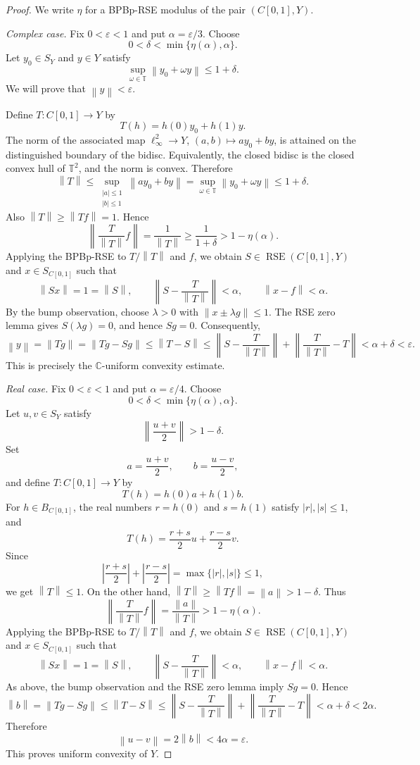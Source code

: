 \documentclass[11pt]{article}
\newcommand{\C}{\mathbb C}
\newcommand{\T}{\mathbb T}
\newcommand{\RSE}{\operatorname{RSE}}
\newcommand{\norm}[1]{\left\lVert #1 \right\rVert}
\begin{document}
\begin{proof}
We write $\eta$ for a BPBp-RSE modulus of the pair $(C[0,1],Y)$.

\smallskip
\noindent\emph{Complex case.}
Fix $0<\varepsilon<1$ and put $\alpha=\varepsilon/3$. Choose
\[
  0<\delta<\min\{\eta(\alpha),\alpha\}.
\]
Let $y_0\in S_Y$ and $y\in Y$ satisfy
\[
  \sup_{\omega\in\T}\norm{y_0+\omega y}\le 1+\delta.
\]
We will prove that $\norm{y}<\varepsilon$.

Define $T\colon C[0,1]\to Y$ by
\[
  T(h)=h(0)y_0+h(1)y.
\]
The norm of the associated map $\ell_\infty^2\to Y$,
$(a,b)\mapsto ay_0+by$, is attained on the distinguished boundary of the
bidisc. Equivalently, the closed bidisc is the closed convex hull of
$\T^2$, and the norm is convex. Therefore
\[
  \norm{T}
  \le
  \sup_{\substack{|a|\le 1\\ |b|\le 1}}\norm{ay_0+by}
  =
  \sup_{\omega\in\T}\norm{y_0+\omega y}
  \le 1+\delta.
\]
Also $\norm{T}\ge\norm{Tf}=1$. Hence
\[
  \left\|\frac{T}{\norm{T}}f\right\|
  =\frac{1}{\norm{T}}
  \ge \frac{1}{1+\delta}
  >1-\eta(\alpha).
\]
Applying the BPBp-RSE to $T/\norm{T}$ and $f$, we obtain
$S\in\RSE(C[0,1],Y)$ and $x\in S_{C[0,1]}$ such that
\[
  \norm{Sx}=1=\norm{S},\qquad
  \left\|S-\frac{T}{\norm{T}}\right\|<\alpha,\qquad
  \norm{x-f}<\alpha.
\]
By the bump observation, choose $\lambda>0$ with
$\norm{x\pm\lambda g}\le 1$. The RSE zero lemma gives
$S(\lambda g)=0$, and hence $Sg=0$. Consequently,
\[
  \norm{y}
  =
  \norm{Tg}
  =
  \norm{Tg-Sg}
  \le
  \norm{T-S}
  \le
  \left\|S-\frac{T}{\norm{T}}\right\|
     +\left\|\frac{T}{\norm{T}}-T\right\|
  <
  \alpha+\delta
  <\varepsilon.
\]
This is precisely the $\C$-uniform convexity estimate.

\smallskip
\noindent\emph{Real case.}
Fix $0<\varepsilon<1$ and put $\alpha=\varepsilon/4$. Choose
\[
  0<\delta<\min\{\eta(\alpha),\alpha\}.
\]
Let $u,v\in S_Y$ satisfy
\[
  \left\|\frac{u+v}{2}\right\|>1-\delta.
\]
Set
\[
  a=\frac{u+v}{2},\qquad b=\frac{u-v}{2},
\]
and define $T\colon C[0,1]\to Y$ by
\[
  T(h)=h(0)a+h(1)b.
\]
For $h\in B_{C[0,1]}$, the real numbers $r=h(0)$ and $s=h(1)$ satisfy
$|r|,|s|\le 1$, and
\[
  T(h)
  =
  \frac{r+s}{2}u+\frac{r-s}{2}v.
\]
Since
\[
  \left|\frac{r+s}{2}\right|+\left|\frac{r-s}{2}\right|
  =
  \max\{|r|,|s|\}
  \le 1,
\]
we get $\norm{T}\le 1$. On the other hand,
$\norm{T}\ge\norm{Tf}=\norm{a}>1-\delta$.
Thus
\[
  \left\|\frac{T}{\norm{T}}f\right\|
  =
  \frac{\norm{a}}{\norm{T}}
  >1-\eta(\alpha).
\]
Applying the BPBp-RSE to $T/\norm{T}$ and $f$, we obtain
$S\in\RSE(C[0,1],Y)$ and $x\in S_{C[0,1]}$ such that
\[
  \norm{Sx}=1=\norm{S},\qquad
  \left\|S-\frac{T}{\norm{T}}\right\|<\alpha,\qquad
  \norm{x-f}<\alpha.
\]
As above, the bump observation and the RSE zero lemma imply $Sg=0$. Hence
\[
  \norm{b}
  =
  \norm{Tg-Sg}
  \le
  \norm{T-S}
  \le
  \left\|S-\frac{T}{\norm{T}}\right\|
     +\left\|\frac{T}{\norm{T}}-T\right\|
  <
  \alpha+\delta
  <2\alpha.
\]
Therefore
\[
  \norm{u-v}=2\norm{b}<4\alpha=\varepsilon.
\]
This proves uniform convexity of $Y$.
\end{proof}
\end{document}

